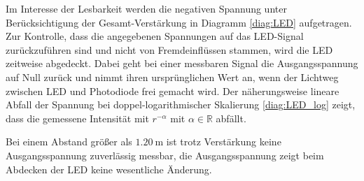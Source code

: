 Im Interesse der Lesbarkeit werden die negativen Spannung unter Berücksichtigung der Gesamt-Verstärkung in Diagramm \ref{diag:LED} aufgetragen.
Zur Kontrolle, dass die angegebenen Spannungen auf das LED-Signal zurückzuführen sind und nicht von Fremdeinflüssen stammen, wird die LED zeitweise abgedeckt.
Dabei geht bei einer messbaren Signal die Ausgangsspannung auf Null zurück und nimmt ihren ursprünglichen Wert an, wenn der Lichtweg zwischen LED und Photodiode frei gemacht wird.
Der näherungsweise lineare Abfall der Spannung bei doppel-logarithmischer Skalierung \eqref{diag:LED_log} zeigt, dass die gemessene Intensität mit $r^{-\alpha}$ mit $\alpha \in \mathbb{R}$ abfällt.

Bei einem Abstand größer als $\SI{1.20}{\meter}$ ist trotz Verstärkung keine Ausgangsspannung zuverlässig messbar, 
die Ausgangsspannung zeigt beim Abdecken der LED keine wesentliche Änderung.

